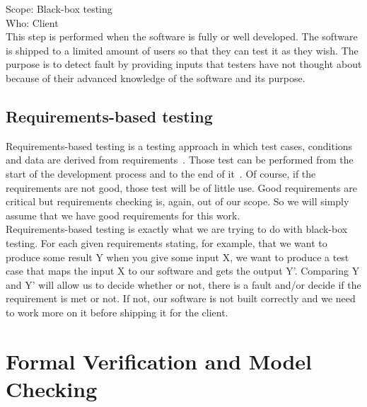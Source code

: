 \documentclass[12pt]{article}
\begin{document}
Scope: Black-box testing\\
Who: Client\\

This step is performed when the software is fully or well developed. The software is shipped to a limited amount of users so that they can test it as they wish. The purpose is to detect fault by providing inputs that testers have not thought about because of their advanced knowledge of the software and its purpose.

\subsection{Requirements-based testing}

Requirements-based testing is a testing approach in which test cases, conditions and data are derived from requirements~\cite{IBMRequirementBasedTesting:2017}. Those test can be performed from the start of the development process and to the end of it~\cite{BenderRBTRequirementBasedTesting:2017}. Of course, if the requirements are not good, those test will be of little use. Good requirements are critical but requirements checking is, again, out of our scope. So we will simply assume that we have good requirements for this work.\\

Requirements-based testing is exactly what we are trying to do with black-box testing. For each given requirements stating, for example, that we want to produce some result Y when you give some input X, we want to produce a test case that maps the input X to our software and gets the output Y'. Comparing Y and Y' will allow us to decide whether or not, there is a fault and/or decide if the requirement is met or not. If not, our software is not built correctly and we need to work more on it before shipping it for the client.\\



\clearpage
\section{Formal Verification and Model Checking}
\end{document}
